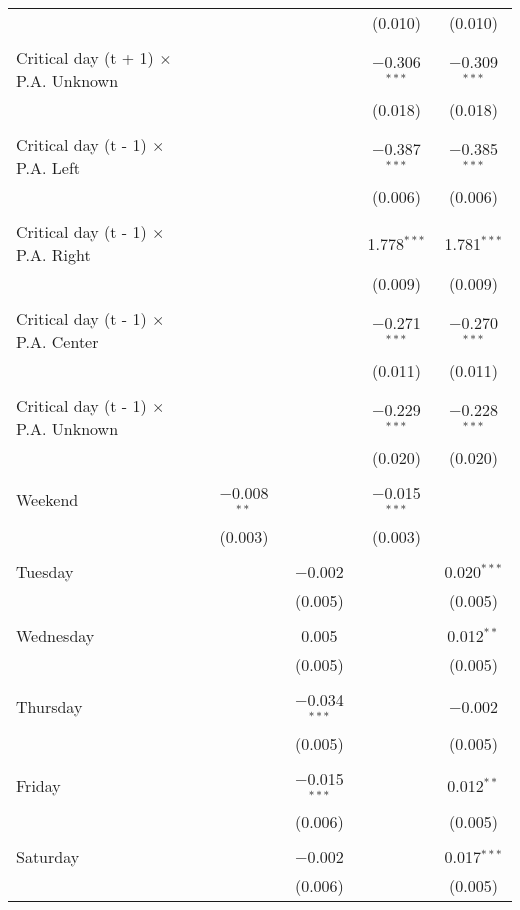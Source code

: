 \documentclass[
]{article}
\begin{document}
\begin{table}[!htbp]
{\begin{tabular}{@{\extracolsep{5pt}}lcccc}
  &  &  & (0.010) & (0.010) \\ 
  & & & & \\ 
 Critical day (t + 1) $\times$ P.A. Unknown &  &  & $-$0.306$^{***}$ & $-$0.309$^{***}$ \\ 
  &  &  & (0.018) & (0.018) \\ 
  & & & & \\ 
 Critical day (t - 1) $\times$ P.A. Left &  &  & $-$0.387$^{***}$ & $-$0.385$^{***}$ \\ 
  &  &  & (0.006) & (0.006) \\ 
  & & & & \\ 
 Critical day (t - 1) $\times$ P.A. Right &  &  & 1.778$^{***}$ & 1.781$^{***}$ \\ 
  &  &  & (0.009) & (0.009) \\ 
  & & & & \\ 
 Critical day (t - 1) $\times$ P.A. Center &  &  & $-$0.271$^{***}$ & $-$0.270$^{***}$ \\ 
  &  &  & (0.011) & (0.011) \\ 
  & & & & \\ 
 Critical day (t - 1) $\times$ P.A. Unknown &  &  & $-$0.229$^{***}$ & $-$0.228$^{***}$ \\ 
  &  &  & (0.020) & (0.020) \\ 
  & & & & \\ 
 Weekend & $-$0.008$^{**}$ &  & $-$0.015$^{***}$ &  \\ 
  & (0.003) &  & (0.003) &  \\ 
  & & & & \\ 
 Tuesday &  & $-$0.002 &  & 0.020$^{***}$ \\ 
  &  & (0.005) &  & (0.005) \\ 
  & & & & \\ 
 Wednesday &  & 0.005 &  & 0.012$^{**}$ \\ 
  &  & (0.005) &  & (0.005) \\ 
  & & & & \\ 
 Thursday &  & $-$0.034$^{***}$ &  & $-$0.002 \\ 
  &  & (0.005) &  & (0.005) \\ 
  & & & & \\ 
 Friday &  & $-$0.015$^{***}$ &  & 0.012$^{**}$ \\ 
  &  & (0.006) &  & (0.005) \\ 
  & & & & \\ 
 Saturday &  & $-$0.002 &  & 0.017$^{***}$ \\ 
  &  & (0.006) &  & (0.005) \\ 

\end{tabular}}
\end{table}
\end{document}
